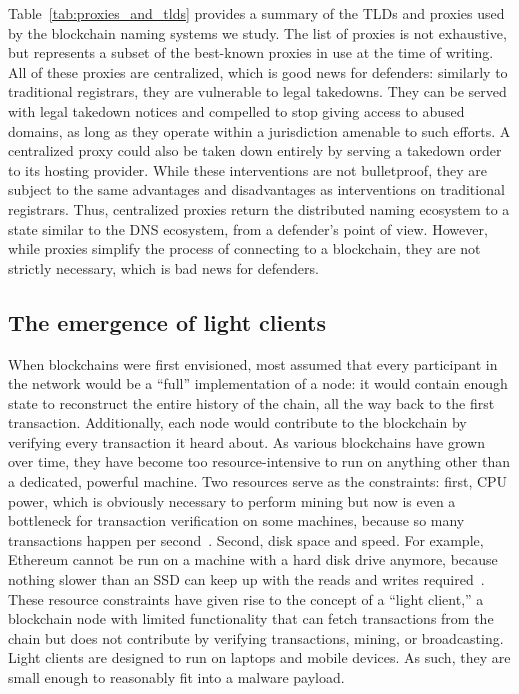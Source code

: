 Table~\ref{tab:proxies_and_tlds} provides a summary of the TLDs and 
proxies 
used by the blockchain naming systems we study. The list of proxies is not 
exhaustive, but 
represents 
a subset of the best-known proxies in use at the time of writing.
All of these proxies are 
centralized, which is good news for defenders: similarly to traditional 
registrars, they are vulnerable to legal takedowns. They can be served with 
legal takedown notices and compelled to stop giving access to abused domains, 
as long as they 
operate within a jurisdiction amenable to such efforts. A centralized proxy 
could also be taken 
down entirely by serving a takedown order to its hosting provider. While 
these interventions are 
not bulletproof, they are subject to the same advantages and disadvantages 
as 
interventions on traditional registrars. Thus, centralized proxies return 
the 
distributed naming ecosystem to a state similar to the DNS ecosystem, from a 
defender's point of view. However, while proxies simplify the process of 
connecting to a blockchain, they are not strictly necessary, which is bad 
news 
for defenders.


\subsection{The emergence of light clients}

When blockchains were first envisioned, most assumed that every participant in 
the network would be a ``full'' implementation of a node: it would contain 
enough state to reconstruct the entire history of the chain, all the way back 
to the first transaction. Additionally, each node would contribute to the 
blockchain by verifying every transaction it heard about. As various 
blockchains have grown over time, they have become too resource-intensive to 
run on anything other than a dedicated, powerful machine. Two 
resources serve as 
the constraints: first, CPU power, which is obviously necessary to perform 
mining but now is even a bottleneck for transaction verification on some 
machines, because so many transactions happen per 
second~\cite{citation_needed}. Second, disk 
space and speed. For example, Ethereum cannot be run on a machine with a hard 
disk drive anymore, because nothing slower than an SSD can keep up with the 
reads and writes required~\cite{citation_needed}.  These resource constraints have 
given rise to the concept of a ``light client,'' a blockchain 
node with limited functionality that can fetch transactions 
from the chain but does not contribute by verifying 
transactions, mining, or broadcasting. Light clients are 
designed to run on laptops and mobile devices. As 
such, they are small enough to reasonably fit into a malware 
payload. 

